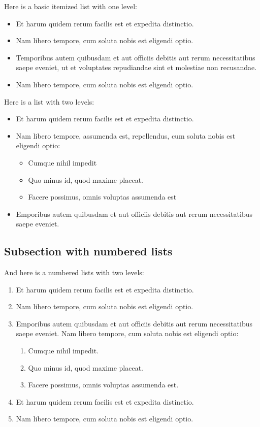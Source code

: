 \documentclass{article}
\begin{document}
Here is a basic itemized list with one level:
\begin{itemize}
\item Et harum quidem rerum facilis est et expedita distinctio.
\item Nam libero tempore, cum soluta nobis est eligendi optio.
\item Temporibus autem quibusdam et aut officiis debitis aut rerum necessitatibus saepe eveniet, ut et voluptates repudiandae sint et molestiae non recusandae.
\item Nam libero tempore, cum soluta nobis est eligendi optio.
\end{itemize}
 \wcTpLoremIpsum*[type=sentence,words-per-sentence=34,seed=135]{}  Here is a list with two levels:
\begin{itemize}
\item Et harum quidem rerum facilis est et expedita distinctio.
\item Nam libero tempore, assumenda est, repellendus, cum soluta nobis est eligendi optio:
\begin{itemize}
\item Cumque nihil impedit
\item Quo minus id, quod maxime placeat. \wcTpLoremIpsum*[type=sentence,words-per-sentence=20,seed=136]{} 
\item Facere possimus, omnis voluptas assumenda est
\end{itemize}
\item Emporibus autem quibusdam et aut officiis debitis aut rerum necessitatibus saepe eveniet. \wcTpLoremIpsum*[type=sentence,words-per-sentence=9,seed=137]{} 
\end{itemize}
 \wcTpLoremIpsum*[type=sentence,words-per-sentence=69,seed=138]{} 

\subsection{Subsection with numbered lists}\label{s:numberedlists}

And here is a numbered lists with two levels:
\begin{enumerate}
\item Et harum quidem rerum facilis est et expedita distinctio.
\item Nam libero tempore, cum soluta nobis est eligendi optio.
\item Emporibus autem quibusdam et aut officiis debitis aut rerum necessitatibus saepe eveniet. Nam libero tempore, cum soluta nobis est eligendi optio:
\begin{enumerate}
	\item Cumque nihil impedit.
	\item Quo minus id, quod maxime placeat.
	\item Facere possimus, omnis voluptas assumenda est.
\end{enumerate}
\item Et harum quidem rerum facilis est et expedita distinctio.
\item Nam libero tempore, cum soluta nobis est eligendi optio.
\end{enumerate}
 \wcTpLoremIpsum*[type=sentence,words-per-sentence=20,seed=139]{}  
\end{document}
